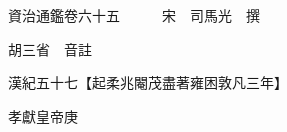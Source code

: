 










 


 
 


 

  
  
  
  
  





  
  
  
  
  
 
  

  

  
  
  



  

 
 

  
   




  

  
  


  　　資治通鑑卷六十五　　　宋　司馬光　撰

　　胡三省　音註

　　漢紀五十七【起柔兆閹茂盡著雍困敦凡三年】

　　孝獻皇帝庚

